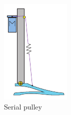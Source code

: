   \begin{figure}[hb!]
    \begin{subfigure}{.19\textwidth}
      \centering
      \includegraphics[width=\linewidth]{figures/illustration_serial_pulley.pdf}
      \caption{Serial pulley}
      \label{fig:series_pulley}
    \end{subfigure}
    \begin{subfigure}{.19\textwidth}
      \centering

\end{subfigure}
\end{figure}
